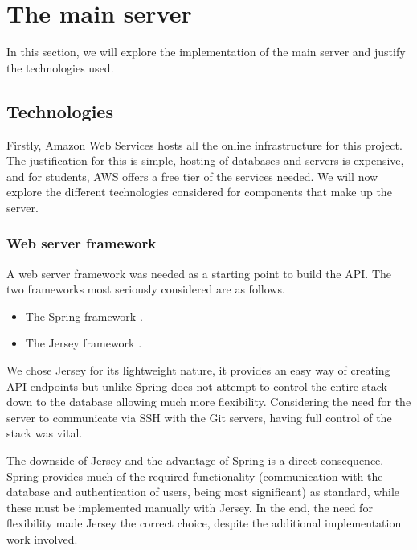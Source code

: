 
\section{The main server}

In this section, we will explore the implementation of the main server and justify the technologies used.

\subsection{Technologies}\label{sec:technologies}

Firstly, Amazon Web Services hosts all the online infrastructure for this project. The justification for this is simple, hosting of databases and servers is expensive, and for students, AWS offers a free tier of the services needed. We will now explore the different technologies considered for components that make up the server.


\subsubsection{Web server framework}

A web server framework was needed as a starting point to build the API. The two frameworks most seriously considered are as follows.

\begin{itemize}
\item The Spring framework \cite{spring}.
\item The Jersey framework \cite{jersey}.
\end{itemize}

We chose Jersey for its lightweight nature, it provides an easy way of creating API endpoints but unlike Spring does not attempt to control the entire stack down to the database allowing much more flexibility. Considering the need for the server to communicate via SSH with the Git servers, having full control of the stack was vital.

The downside of Jersey and the advantage of Spring is a direct consequence. Spring provides much of the required functionality (communication with the database and authentication of users, being most significant) as standard, while these must be implemented manually with Jersey. In the end, the need for flexibility made Jersey the correct choice, despite the additional implementation work involved.


